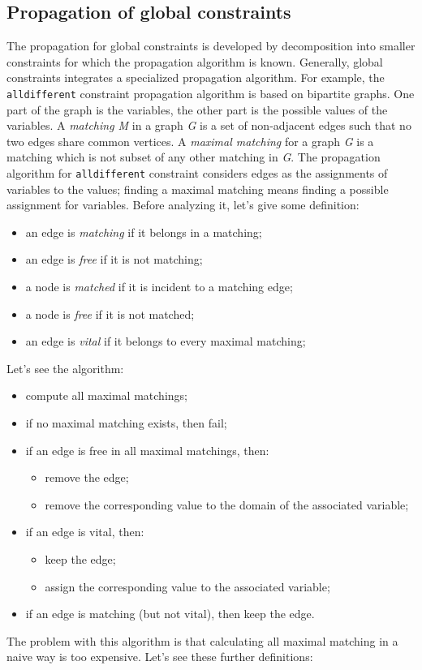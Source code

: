 \documentclass[10pt,a4paper]{article}
\begin{document}
\subsection{Propagation of global constraints}
The propagation for global constraints is developed by decomposition into
smaller constraints for which the propagation algorithm is known. Generally,
global constraints integrates a specialized propagation algorithm. For example,
the \texttt{alldifferent} constraint propagation algorithm is based on bipartite
graphs. One part of the graph is the variables, the other part is the possible
values of the variables. A \textit{matching M} in a graph \textit{G} is a set of
non-adjacent edges such that no two edges share common vertices. A
\textit{maximal matching} for a graph \textit{G} is a matching which is not
subset of any other matching in \textit{G}. The propagation algorithm for
\texttt{alldifferent} constraint considers edges as the assignments of variables
to the values; finding a maximal matching means finding a possible assignment
for variables. Before analyzing it, let's give some definition:

\begin{itemize}
    \item an edge is \textit{matching} if it belongs in a matching;
    \item an edge is \textit{free} if it is not matching;
    \item a node is \textit{matched} if it is incident to a matching edge;
    \item a node is \textit{free} if it is not matched;
    \item an edge is \textit{vital} if it belongs to every maximal matching;
\end{itemize}
Let's see the algorithm:

\begin{itemize}
    \item compute all maximal matchings;
    \item if no maximal matching exists, then fail;
    \item if an edge is free in all maximal matchings, then:
    \begin{itemize}
        \item remove the edge;
        \item remove the corresponding value to the domain of the associated
        variable;
    \end{itemize}
    \item if an edge is vital, then:
    \begin{itemize}
        \item keep the edge;
        \item assign the corresponding value to the associated variable;
    \end{itemize}
    \item if an edge is matching (but not vital), then keep the edge.
\end{itemize}
The problem with this algorithm is that calculating all maximal matching in a
naive way is too expensive. Let's see these further definitions:
\end{document}
